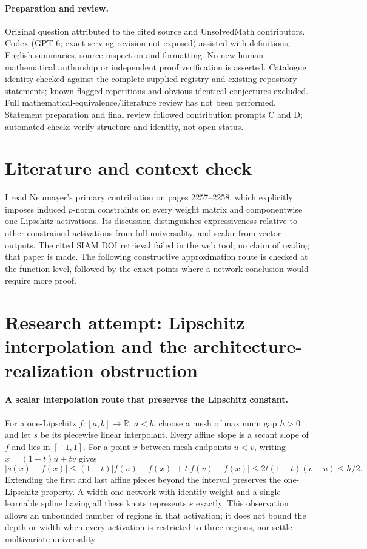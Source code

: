 \documentclass[11pt]{article}
\begin{document}
\paragraph{Preparation and review.}
Original question attributed to the cited source and UnsolvedMath contributors. Codex (GPT-6; exact serving revision not exposed) assisted with definitions, English summaries, source inspection and formatting. No new human mathematical authorship or independent proof verification is asserted. Catalogue identity checked against the complete supplied registry and existing repository statements; known flagged repetitions and obvious identical conjectures excluded. Full mathematical-equivalence/literature review has not been performed. Statement preparation and final review followed contribution prompts C and D; automated checks verify structure and identity, not open status.
\label{end:statement}

\section{Literature and context check}

I read Neumayer's primary contribution on pages 2257--2258, which explicitly
imposes induced $p$-norm constraints on every weight matrix and componentwise
one-Lipschitz activations. Its discussion distinguishes expressiveness relative
to other constrained activations from full universality, and scalar from vector
outputs. The cited SIAM DOI retrieval failed in the web tool; no claim of reading
that paper is made. The following constructive approximation route is checked
at the function level, followed by the exact points where a network conclusion
would require more proof.

\section{Research attempt: Lipschitz interpolation and the architecture-realization obstruction}

\paragraph{A scalar interpolation route that preserves the Lipschitz constant.}
For a one-Lipschitz $f:[a,b]\to\mathbb R$, $a<b$, choose a mesh of maximum
gap $h>0$ and let $s$ be its piecewise linear interpolant. Every affine slope
is a secant slope of $f$ and lies in $[-1,1]$. For a point $x$ between mesh
endpoints $u<v$, writing $x=(1-t)u+tv$ gives
\[
 |s(x)-f(x)|\leq(1-t)|f(u)-f(x)|+t|f(v)-f(x)|
 \leq2t(1-t)(v-u)\leq h/2.
\]
Extending the first and last affine pieces beyond the interval preserves the
one-Lipschitz property. A width-one network with identity weight and a single
learnable spline having all these knots represents $s$ exactly.
This observation allows an unbounded number of regions in that activation;
it does not bound the depth or width when every activation is restricted to
three regions, nor settle multivariate universality.
\end{document}
